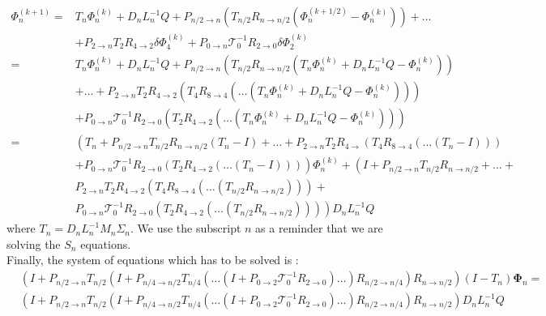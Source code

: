 \documentclass[preprint,10pt]{elsarticle}
\newcommand\bs{\boldsymbol}
\renewcommand{\(}{\left(}
\renewcommand{\)}{\right)}
\renewcommand{\[}{\left[}
\renewcommand{\]}{\right]}
\begin{document}
\begin{equation}
\begin{split}
\Phi_n^{(k+1)} =& T_n \Phi_n^{(k)} + D_n L_n^{-1} Q +
P_{n/2 \rightarrow n} \(T_{n/2}
R_{n\rightarrow n/2} \(\Phi_n^{(k+1/2)} - \Phi_n^{(k)}\)\)+\hdots \\
&+ P_{2 \rightarrow n} T_2 R_{4\rightarrow 2} \delta
\Phi_{4}^{(k)} + P_{0\rightarrow n} \mathcal{T}_0^{-1} R_{2\rightarrow 0} \delta 
\Phi_2^{(k)}\\
=& T_n \Phi_n^{(k)} + D_n L_n^{-1} Q + P_{n/2 \rightarrow
n} \(T_{n/2} R_{n \rightarrow n/2}\(T_n \Phi_n^{(k)} +D_n L_n^{-1} Q -\Phi_n^{(k)}
\)\)\\
& +\hdots + P_{2\rightarrow n} T_2 R_{4\rightarrow 2} 
\(T_4 R_{8\rightarrow 4}\( \hdots \(T_n \Phi_n^{(k)} + D_n L_n^{-1} Q -
 \Phi_n^{(k)}\)\) \) \\ 
&+ P_{0\rightarrow n} \mathcal{T}_0^{-1} R_{2\rightarrow 0}\(T_2 R_{4\rightarrow 2} 
\(\hdots\(T_n \Phi_n^{(k)}+D_n L_n^{-1}Q-\Phi_n^{(k)}\)\)\)\\
=& \(T_n + P_{n/2\rightarrow n} T_{n/2} R_{n\rightarrow n/2}\(T_n-I\)+
 \hdots + P_{2\rightarrow n} T_2 R_{4\rightarrow}
\(T_4 R_{8\rightarrow 4} \(\hdots\(T_n -I\)\)\)\right.\\ 
&\left. +P_{0\rightarrow n} \mathcal{T}_0^{-1} R_{2\rightarrow 0}  \(T_2
R_{4\rightarrow 2} (\hdots \(T_n-I\))\)\) \Phi_n^{(k)}
+\(I+P_{n/2\rightarrow n} T_{n/2} R_{n\rightarrow
n/2}+ \hdots + \right.\\
&\left. P_{2\rightarrow n} T_2 R_{4\rightarrow 2} \(T_4
 R_{8\rightarrow 4}\(\hdots
\(T_{n/2}R_{n\rightarrow n/2}\)\)\)+\right.\\
& \left. P_{0\rightarrow n} \mathcal{T}_0^{-1}R_{2\rightarrow 0}
\(T_2 R_{4\rightarrow 2}\(\hdots\(T_{n/2}R_{n\rightarrow n/2}\)\)\)\)
D_nL_n^{-1} Q
\end{split}
\end{equation}
where $T_n = D_n L_n^{-1}M_n \Sigma_n$. We use the subscript $n$ as a reminder
that we are solving the $S_n$ equations.\\
Finally, the system of equations which has to be solved is :
\begin{equation}
\begin{split}
&(I+P_{{n}/{2}\rightarrow n }
T_{{n}/{2}} (I+P_{{n}/{4}\rightarrow {n}/{2}}T_{{n}/{4}} (\hdots
(I+P_{0\rightarrow 2} \mathcal{T}_0^{-1} R_{2\rightarrow 0})\hdots)
R_{{n}/{2}\rightarrow {n}/{4}})R_{n\rightarrow{n}/{2}})(I-T_n)
\bs{\Phi}_n =\\
& (I+P_{{n}/{2}\rightarrow n} T_{{n}/{2}} (I+P_{{n}/{4}
\rightarrow {n}/{2}} T_{{n}/{4}} (\hdots (I+P_{0 \rightarrow
2}\mathcal{T}_0^{-1} R_{2\rightarrow 0})\hdots)R_{{n}/{2}\rightarrow
{n}/{4}})R_{n\rightarrow {n}/{2}} ) D_n L_n^{-1} Q
\end{split}
\label{anmg-dsa}
\end{equation}  
\end{document}

